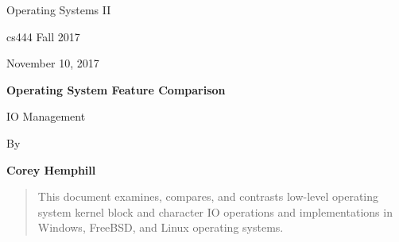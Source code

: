 \documentclass[letterpaper,10pt,draftclsnofoot,onecolumn]{IEEEtran}
\def \Author{Corey Hemphill}
\def \Title{Operating System Feature Comparison}
\def \Subtitle{IO Management}
\def \Term{cs444 Fall 2017}
\def \DueDate{November 10, 2017}
\def \DocType{
	Operating Systems II
}
\begin{document}
\begin{titlepage}
    \begin{singlespace}
        \hfill  
        \par\vspace{.2in}
        \centering
        \scshape {
            \huge  \DocType \par
           	\huge \Term \par
            {\large \DueDate}\par
            \vspace{.5in}
            \textbf{\Huge \Title}\par
            {\large \Subtitle}\par
            \vspace{.5in}          
            {\large By }\par
           	\textbf{\Author}\par
            \vspace{5pt}
            }
            \vspace{120pt}
        
        \begin{abstract}
        This document examines, compares, and contrasts low-level operating system kernel block and character IO operations and implementations in Windows, FreeBSD, and Linux operating systems.
        \end{abstract}
        
    \end{singlespace}
\end{titlepage}
\newpage
\end{document}
